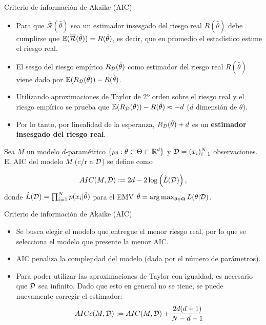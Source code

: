 \documentclass[handout, 9pt]{beamer}
\begin{document}
\begin{frame}{Criterio de información de Akaike (AIC)}
	\begin{itemize}
		\item Para que $\overline{\mathcal{R}}(\hat{\theta})$ sea un estimador insesgado del riesgo real $R(\hat{\theta})$ debe cumplirse que $\operatorname{\mathbb{E}}(\overline{\mathcal{R}}(\hat{\theta}))=R(\hat{\theta})$, es decir, que en promedio el estadístico estime el riesgo real.
		\item El sesgo del riesgo empírico $R_{\mathcal D}(\hat{\theta})$ como estimador del riesgo real $R(\hat{\theta})$ viene dado por $\operatorname{\mathbb{E}}(R_{\mathcal D}(\hat{\theta}))-R(\hat{\theta})$.
		\item Utilizando aproximaciones de Taylor de 2º orden sobre el riesgo real y el riesgo empírico se prueba que $\operatorname{\mathbb{E}}(R_{\mathcal D}(\hat{\theta})) - R(\hat{\theta}) \approx -d$ ($d$ dimensión de $\theta$).
		\item Por lo tanto, por linealidad de la esperanza, $R_{\mathcal D}(\hat{\theta})+d$ es un \textbf{estimador insesgado del riesgo real}.
	\end{itemize}
	
\begin{definition}[AIC]
	Sea $M$ un modelo $d$-paramétrico $\{p_\theta:\theta\in\Theta\subset\mathbb{R}^d\}$ y ${\mathcal D}=(x_i)_{i=1}^N$ observaciones. El AIC del modelo $M$ (c/r a ${\mathcal D}$) se define como
	
	\begin{equation*}
		AIC(M,{\mathcal D}):=2d-2\log\left(\hat{L}({\mathcal D})\right),
	\end{equation*}
donde $\hat{L}({\mathcal D}) = \prod_{i=1}^N p(x_i|\hat{\theta})$ para el EMV $\hat{\theta} = \operatorname*{arg\,max}_{\theta\in\Theta} L(\theta|{\mathcal D})$.
\end{definition}
\end{frame}


\begin{frame}{Criterio de información de Akaike (AIC)}

\begin{itemize}
	\item Se busca elegir el modelo que entregue el menor riesgo real, por lo que se selecciona el modelo que presente la menor AIC.
	\item AIC penaliza la complejidad del modelo (dada por el número de parámetros).
	\item Para poder utilizar las aproximaciones de Taylor con igualdad, es necesario que ${\mathcal D}$ sea infinito. Dado que esto en general no se tiene, se puede nuevamente corregir el estimador:
	\begin{equation*}
		AICc(M,{\mathcal D}) := AIC(M,{\mathcal D}) + \frac{2d(d+1)}{N-d-1}
	\end{equation*}
\end{itemize}
	
\end{frame}
\end{document}
